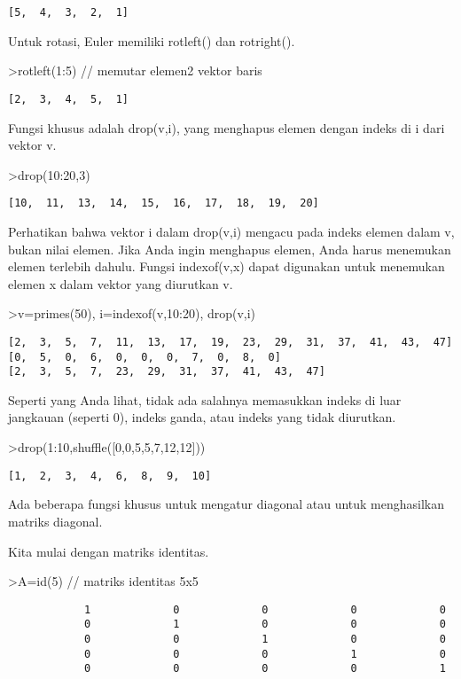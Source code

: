 \documentclass[
]{book}
\begin{document}
\begin{verbatim}
[5,  4,  3,  2,  1]
\end{verbatim}

Untuk rotasi, Euler memiliki rotleft() dan rotright().

\textgreater rotleft(1:5) // memutar elemen2 vektor baris

\begin{verbatim}
[2,  3,  4,  5,  1]
\end{verbatim}

Fungsi khusus adalah drop(v,i), yang menghapus elemen dengan indeks di i dari vektor v.

\textgreater drop(10:20,3)

\begin{verbatim}
[10,  11,  13,  14,  15,  16,  17,  18,  19,  20]
\end{verbatim}

Perhatikan bahwa vektor i dalam drop(v,i) mengacu pada indeks elemen dalam v, bukan nilai elemen. Jika Anda ingin menghapus elemen, Anda harus menemukan elemen terlebih dahulu. Fungsi indexof(v,x) dapat digunakan untuk menemukan elemen x dalam vektor yang diurutkan v.

\textgreater v=primes(50), i=indexof(v,10:20), drop(v,i)

\begin{verbatim}
[2,  3,  5,  7,  11,  13,  17,  19,  23,  29,  31,  37,  41,  43,  47]
[0,  5,  0,  6,  0,  0,  0,  7,  0,  8,  0]
[2,  3,  5,  7,  23,  29,  31,  37,  41,  43,  47]
\end{verbatim}

Seperti yang Anda lihat, tidak ada salahnya memasukkan indeks di luar jangkauan (seperti 0), indeks ganda, atau indeks yang tidak diurutkan.

\textgreater drop(1:10,shuffle({[}0,0,5,5,7,12,12{]}))

\begin{verbatim}
[1,  2,  3,  4,  6,  8,  9,  10]
\end{verbatim}

Ada beberapa fungsi khusus untuk mengatur diagonal atau untuk menghasilkan matriks diagonal.

Kita mulai dengan matriks identitas.

\textgreater A=id(5) // matriks identitas 5x5

\begin{verbatim}
            1             0             0             0             0 
            0             1             0             0             0 
            0             0             1             0             0 
            0             0             0             1             0 
            0             0             0             0             1 
\end{verbatim}
\end{document}

